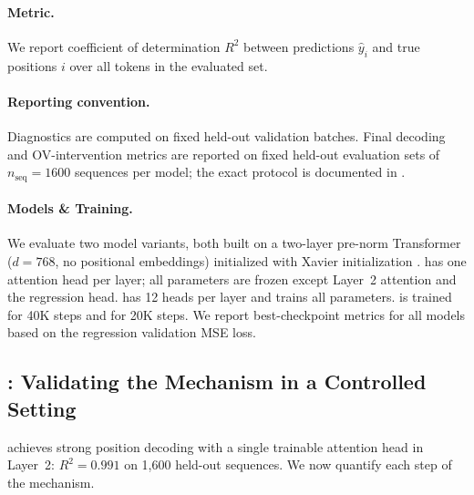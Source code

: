 \documentclass{article}
\theoremstyle{plain}
\theoremstyle{definition}
\theoremstyle{remark}
\begin{document}
\paragraph{Metric.}
We report coefficient of determination $R^2$ between predictions $\hat y_i$ and true positions $i$ over all tokens in the evaluated set.

\paragraph{Reporting convention.}
Diagnostics are computed on fixed held-out validation batches.
Final decoding and OV-intervention metrics are reported on fixed held-out evaluation sets of
$n_{\text{seq}}=1600$ sequences per model; the exact protocol is documented in .

\paragraph{Models \& Training.}
We evaluate two model variants, both built on a two-layer pre-norm Transformer ($d=768$, no positional embeddings)
initialized with Xavier initialization \citep{glorot2010understanding}.
\modelminimal has one attention head per layer; all parameters are frozen except Layer~2 attention and the regression head.
\modelfull has 12 heads per layer and trains all parameters.
\modelminimal is trained for 40K steps and \modelfull for 20K steps.
We report best-checkpoint metrics for all models based on the regression validation MSE loss.

\subsection{\modelminimal: Validating the Mechanism in a Controlled Setting}
\label{subsec:minimal_evidence}

\modelminimal achieves strong position decoding with a single trainable attention head in Layer~2:
$R^2=0.991$ on 1,600 held-out sequences.
We now quantify each step of the mechanism.
\end{document}
